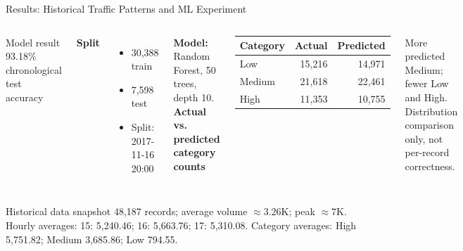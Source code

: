 \documentclass[aspectratio=169,11pt]{beamer}
\begin{document}
\begin{frame}[t]{Results: Historical Traffic Patterns and ML Experiment}
\vspace{-1mm}
\begin{columns}[T,onlytextwidth]
\begin{block}{Model result}
\centering
{\fontsize{26}{28}\selectfont\textcolor{TrafficBlue}{93.18\%}}\\[-1pt]
\scriptsize chronological test accuracy
\end{block}
\vspace{-1mm}
\footnotesize
\textbf{Split}
\begin{itemize}\itemsep0pt\parskip0pt
\item 30,388 train
\item 7,598 test
\item Split: 2017-11-16 20:00
\end{itemize}
\textbf{Model:} Random Forest, 50 trees, depth 10.
\textbf{\small Actual vs. predicted category counts}
\begin{center}
\footnotesize
\begin{tabular}{lrr}
\toprule
\textbf{Category} & \textbf{Actual} & \textbf{Predicted} \\
\midrule
Low & 15,216 & 14,971 \\
Medium & 21,618 & 22,461 \\
High & 11,353 & 10,755 \\
\bottomrule
\end{tabular}
\end{center}
\vspace{-1mm}
\footnotesize
More predicted Medium; fewer Low and High. Distribution comparison only, not per-record correctness.
\end{columns}

\vfill
\begin{block}{Historical data snapshot}
\scriptsize
48,187 records; average volume $\approx 3.26$K; peak $\approx 7$K. Hourly averages: 15: 5,240.46; 16: 5,663.76; 17: 5,310.08. Category averages: High 5,751.82; Medium 3,685.86; Low 794.55.
\end{block}
\vspace{1mm}
\end{frame}
\end{document}
